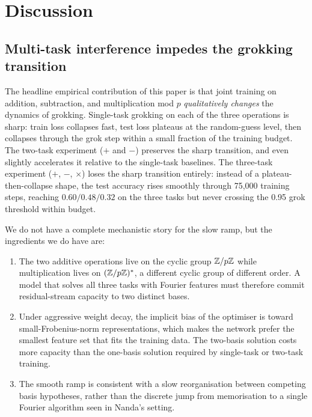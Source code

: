 \section{Discussion}
\label{sec:discussion}

\subsection{Multi-task interference impedes the grokking transition}

The headline empirical contribution of this paper is that joint
training on addition, subtraction, and multiplication mod $p$
\emph{qualitatively changes} the dynamics of grokking. Single-task
grokking on each of the three operations is sharp: train loss
collapses fast, test loss plateaus at the random-guess level, then
collapses through the grok step within a small fraction of the
training budget. The two-task experiment ($+$ and $-$) preserves the
sharp transition, and even slightly accelerates it relative to the
single-task baselines. The three-task experiment ($+$, $-$, $\times$)
loses the sharp transition entirely: instead of a plateau-then-collapse
shape, the test accuracy rises smoothly through 75{,}000 training
steps, reaching $0.60 / 0.48 / 0.32$ on the three tasks but never
crossing the 0.95 grok threshold within budget.

We do not have a complete mechanistic story for the slow ramp, but the
ingredients we do have are:
\begin{enumerate}
\item The two additive operations live on the cyclic group $\mathbb{Z}/p\mathbb{Z}$
      while multiplication lives on $(\mathbb{Z}/p\mathbb{Z})^*$, a different cyclic
      group of different order. A model that solves all three tasks
      with Fourier features must therefore commit residual-stream
      capacity to two distinct bases.
\item Under aggressive weight decay, the implicit bias of the
      optimiser is toward small-Frobenius-norm representations, which
      makes the network prefer the smallest feature set that fits the
      training data. The two-basis solution costs more capacity than
      the one-basis solution required by single-task or two-task
      training.
\item The smooth ramp is consistent with a slow reorganisation
      between competing basis hypotheses, rather than the discrete
      jump from memorisation to a single Fourier algorithm seen in
      Nanda's setting.
\end{enumerate}

